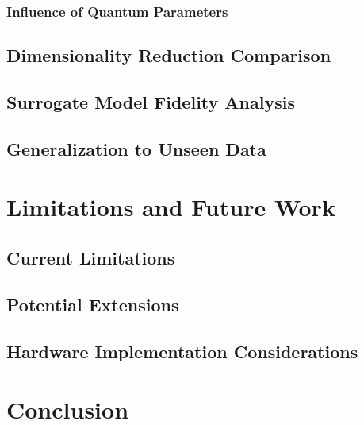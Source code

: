 \documentclass[conference]{IEEEtran}
\begin{document}
\subsubsection{Influence of Quantum Parameters}
\subsection{Dimensionality Reduction Comparison}
\subsection{Surrogate Model Fidelity Analysis}
\subsection{Generalization to Unseen Data}


\section{Limitations and Future Work}
\subsection{Current Limitations}
\subsection{Potential Extensions}
\subsection{Hardware Implementation Considerations}

\section{Conclusion}




\newpage
\newpage
\tableofcontents
\end{document}
